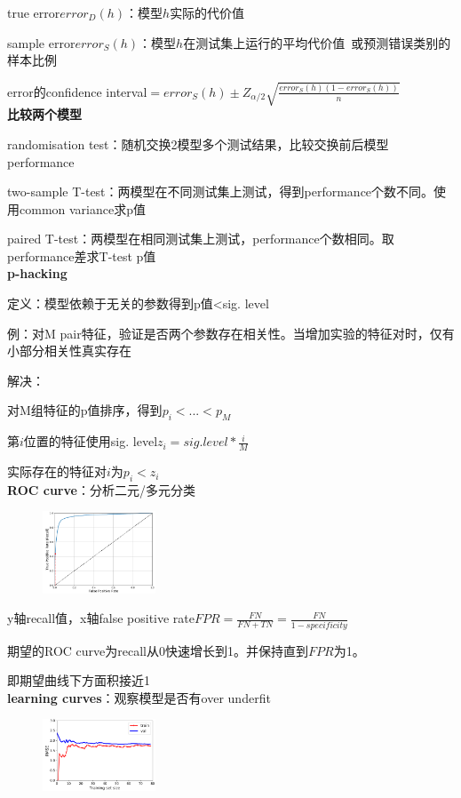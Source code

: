 \documentclass[UTF8]{ctexart}
\begin{document}
  true error$error_D(h)$：模型$h$实际的代价值

  sample error$error_S(h)$：模型$h$在测试集上运行的平均代价值\ 或预测错误类别的样本比例

  error的confidence interval$= error_S(h) \pm Z_{\alpha/2}\sqrt{\frac{error_S(h)(1-error_S(h))}{n}}$\\
\textbf{比较两个模型}

  randomisation test：随机交换2模型多个测试结果，比较交换前后模型performance

  two-sample T-test：两模型在不同测试集上测试，得到performance个数不同。使用common variance求p值

  paired T-test：两模型在相同测试集上测试，performance个数相同。取performance差求T-test p值\\
\textbf{p-hacking}

  定义：模型依赖于无关的参数得到p值<sig. level

  \quad 例：对M pair特征，验证是否两个参数存在相关性。当增加实验的特征对时，仅有小部分相关性真实存在

  解决：
  
  \quad 对M组特征的p值排序，得到$p_i < ...< p_M$

  \quad 第$i$位置的特征使用sig. level$z_i = sig. level * \frac{i}{M}$ 

  \quad 实际存在的特征对$i$为$p_i < z_i$\\
\textbf{ROC curve}：分析二元/多元分类

  \begin{figure}[H] %
    \centering %
    \includegraphics[width=0.3\textwidth]{note_images/ROC_curve.png} %
  \end{figure}

  y轴recall值，x轴false positive rate$FPR = \frac{FN}{FN + TN} = \frac{FN}{1-specificity}$

  期望的ROC curve为recall从0快速增长到1。并保持直到$FPR$为1。
  
  \quad 即期望曲线下方面积接近1\\
\textbf{learning curves}：观察模型是否有over underfit

  \begin{figure}[H] %
    \centering %
    \includegraphics[width=0.3\textwidth]{note_images/learning_curve.png} %
  \end{figure}
\end{document}
